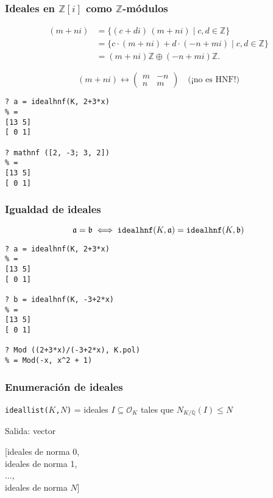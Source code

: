 \documentclass{beamer}
\newcommand{\ZZ}{\mathbb{Z}}
\newcommand{\QQ}{\mathbb{Q}}
\renewcommand{\O}{\mathcal{O}}
\begin{document}

\begin{frame}[fragile]
  \frametitle{Ideales en $\ZZ [i]$ como $\ZZ$-módulos}

  \begin{align*}
    (m+ni) & = \{(c + di)\,(m + ni) \mid c, d \in \ZZ \} \\
    & = \{ c \cdot (m + ni) + d \cdot (-n + mi) \mid c, d \in \ZZ \} \\
    & = (m + ni) \ZZ \oplus (-n + mi) \ZZ.
  \end{align*}

  \[ (m+ni) \longleftrightarrow \begin{pmatrix}
    m & -n \\
    n & m
  \end{pmatrix} \quad \text{(¡no es HNF!)} \]

  \begin{shaded}\small
\begin{verbatim}
? a = idealhnf(K, 2+3*x)
% = 
[13 5]
[ 0 1]

? mathnf ([2, -3; 3, 2])
% = 
[13 5]
[ 0 1]
\end{verbatim}
  \end{shaded}
\end{frame}


\begin{frame}[fragile]
  \frametitle{Igualdad de ideales}

  \[ \mathfrak{a} = \mathfrak{b} \iff \text{\tt idealhnf}(K,\mathfrak{a}) = \text{\tt idealhnf}(K,\mathfrak{b}) \]

  \begin{shaded}
\begin{verbatim}
? a = idealhnf(K, 2+3*x)
% = 
[13 5]
[ 0 1]

? b = idealhnf(K, -3+2*x)
% =
[13 5]
[ 0 1]

? Mod ((2+3*x)/(-3+2*x), K.pol)
% = Mod(-x, x^2 + 1)
\end{verbatim}
  \end{shaded}
\end{frame}


\begin{frame}[fragile]
  \frametitle{Enumeración de ideales}

  \texttt{ideallist($K$,$N$)} = ideales $I \subseteq \O_K$ tales que $N_{K/\QQ} (I) \le N$


  Salida: vector

  \begin{center}
    [ideales de norma 0,\\
      ideales de norma 1,\\
      $\ldots$,\\
      ideales de norma $N$]
  \end{center}
\end{frame}
\end{document}
